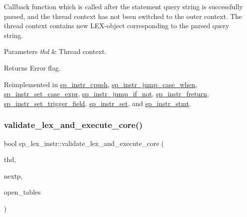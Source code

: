 Callback function which is called after the statement query string is successfully parsed, and the thread context has not been switched to the outer context. The thread context contains new L\+EX-\/object corresponding to the parsed query string.


\begin{DoxyParams}{Parameters}
{\em thd} & Thread context.\\
\hline
\end{DoxyParams}
\begin{DoxyReturn}{Returns}
Error flag. 
\end{DoxyReturn}


Reimplemented in \mbox{\hyperlink{classsp__instr__cpush_a5679b6d149a1941a84bc41ddc42848d6}{sp\+\_\+instr\+\_\+cpush}}, \mbox{\hyperlink{classsp__instr__jump__case__when_a590288e701b813831974c6f6f61884f7}{sp\+\_\+instr\+\_\+jump\+\_\+case\+\_\+when}}, \mbox{\hyperlink{classsp__instr__set__case__expr_a041681a8ad6a4b3aeda887f5537ad624}{sp\+\_\+instr\+\_\+set\+\_\+case\+\_\+expr}}, \mbox{\hyperlink{classsp__instr__jump__if__not_af755479ad936f1b382516679a9ed1dcb}{sp\+\_\+instr\+\_\+jump\+\_\+if\+\_\+not}}, \mbox{\hyperlink{classsp__instr__freturn_aea65606ff061db0c9eb71b0aedecddfd}{sp\+\_\+instr\+\_\+freturn}}, \mbox{\hyperlink{classsp__instr__set__trigger__field_ac578c371c355a3fa089ecec4872e2a59}{sp\+\_\+instr\+\_\+set\+\_\+trigger\+\_\+field}}, \mbox{\hyperlink{classsp__instr__set_aef30b17435828a33ac1f1e60081bc194}{sp\+\_\+instr\+\_\+set}}, and \mbox{\hyperlink{classsp__instr__stmt_a2918355010fb4072cd4eba8628fe931e}{sp\+\_\+instr\+\_\+stmt}}.

\mbox{\label{classsp__lex__instr_a9991350aa928258ec9b2c73c8167d87e}} 
\subsubsection{\texorpdfstring{validate\+\_\+lex\+\_\+and\+\_\+execute\+\_\+core()}{validate\_lex\_and\_execute\_core()}}
{\footnotesize\ttfamily bool sp\+\_\+lex\+\_\+instr\+::validate\+\_\+lex\+\_\+and\+\_\+execute\+\_\+core (\begin{DoxyParamCaption}\item[{T\+HD $\ast$}]{thd,  }\item[{uint $\ast$}]{nextp,  }\item[{bool}]{open\+\_\+tables }\end{DoxyParamCaption})}

